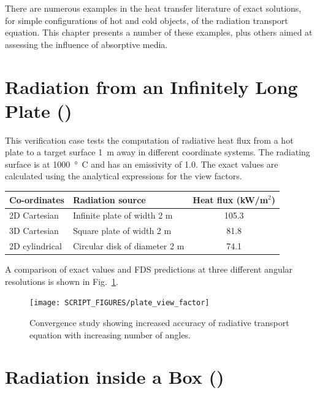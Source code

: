 \documentclass[11pt]{book}
\begin{document}
There are numerous examples in the heat transfer literature of exact solutions, for simple configurations of hot and cold objects, of the radiation transport equation. This chapter presents a number of these examples, plus others aimed at assessing the influence of absorptive media.

\section{Radiation from an Infinitely Long Plate (\texorpdfstring{}{plate\_view\_factor}) }
\label{plate_view_factor}

This verification case tests the computation of radiative heat flux from a hot plate to a target surface 1~m away in different coordinate systems. The radiating surface is at 1000~\si{\degree C} and has an emissivity of 1.0.  The exact values are calculated using the analytical expressions for the view factors.
\begin{center}
\begin{tabular}{|l|l|c|}
\hline Co-ordinates & Radiation source & Heat flux (kW/m$^2$)  \\ \hline \hline
2D Cartesian   & Infinite plate of width 2 m   & 105.3 \\
3D Cartesian   & Square plate of width 2 m     & 81.8 \\
2D cylindrical & Circular disk of diameter 2 m & 74.1 \\ \hline
\end{tabular}
\end{center}
A comparison of exact values and FDS predictions at three different angular resolutions is shown in Fig.~\ref{fig_plate_view_factor}.
\begin{figure}[ht]
\centering
\texttt{[image: SCRIPT\_FIGURES/plate\_view\_factor]}
\caption[The {\ct plate\_view\_factor} test case]{Convergence study showing increased accuracy of radiative transport equation with increasing number of angles.}
\label{fig_plate_view_factor}
\end{figure}



\section{Radiation inside a Box (\texorpdfstring{}{radiation\_box}) }
\label{radiation_in_a_box}
\label{radiation_box}
\end{document}
